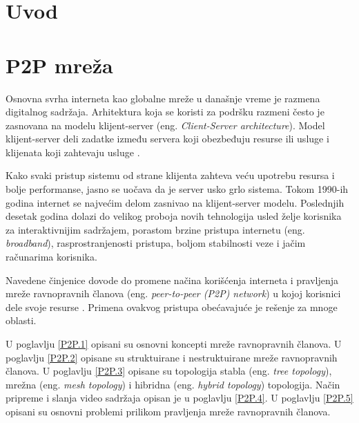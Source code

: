 \documentclass[12pt,oneside]{memoir}
\begin{document}
\frontmatter
\naslovna
\komisija
\apstrakt
\tableofcontents*

\mainmatter

\chapter{Uvod}
\chapter{P2P mreža}
\label{chp:p2p-uvod}

Osnovna svrha interneta kao globalne mreže u današnje vreme je razmena digitalnog sadržaja. Arhitektura koja se koristi za podršku razmeni često je zasnovana na modelu klijent-server (eng. \textit{Client-Server architecture}). Model klijent-server deli zadatke između servera koji obezbeđuju resurse ili usluge i klijenata koji zahtevaju usluge \cite{DeBoever07}.

Kako svaki pristup sistemu od strane klijenta zahteva veću upotrebu resursa i bolje performanse, jasno se uočava da je server usko grlo sistema. 
Tokom 1990-ih godina internet se najvećim delom zasnivao na klijent-server modelu. Poslednjih desetak godina dolazi do velikog proboja novih tehnologija usled želje korisnika za interaktivnijim sadržajem, porastom brzine pristupa internetu (eng. \textit{broadband}), rasprostranjenosti pristupa, boljom stabilnosti veze i jačim računarima korisnika.

Navedene činjenice dovode do promene načina korišćenja interneta i pravljenja mreže ravnopravnih članova (eng. \textit{peer-to-peer (P2P) network}) u kojoj korisnici dele svoje resurse \cite{Tanenbaum}. Primena ovakvog pristupa obećavajuće je rešenje za mnoge oblasti.

U poglavlju \ref{P2P.1} opisani su osnovni koncepti mreže ravnopravnih članova. U poglavlju \ref{P2P.2} opisane su struktuirane i nestruktuirane mreže ravnopravnih članova. U poglavlju \ref{P2P.3} opisane su topologija stabla (eng. \textit{tree topology}), mrežna (eng. \textit{mesh topology}) i hibridna (eng. \textit{hybrid topology}) topologija. Način pripreme i slanja video sadržaja opisan je u poglavlju \ref{P2P.4}. U poglavlju \ref{P2P.5} opisani su osnovni problemi prilikom pravljenja mreže ravnopravnih članova.
\end{document}

